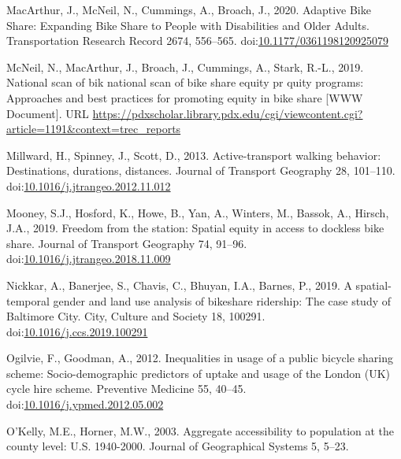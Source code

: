 \documentclass[]{elsarticle} %
\begin{document}
\leavevmode\hypertarget{ref-macarthurAdaptiveBikeShare2020}{}%
MacArthur, J., McNeil, N., Cummings, A., Broach, J., 2020. Adaptive Bike
Share: Expanding Bike Share to People with Disabilities and Older
Adults. Transportation Research Record 2674, 556--565.
doi:\href{https://doi.org/10.1177/0361198120925079}{10.1177/0361198120925079}

\leavevmode\hypertarget{ref-trec2019}{}%
McNeil, N., MacArthur, J., Broach, J., Cummings, A., Stark, R.-L., 2019.
National scan of bik national scan of bike share equity pr quity
programs: Approaches and best practices for promoting equity in bike
share {[}WWW Document{]}. URL
\url{https://pdxscholar.library.pdx.edu/cgi/viewcontent.cgi?article=1191\&context=trec_reports}

\leavevmode\hypertarget{ref-millwardActivetransportWalkingBehavior2013}{}%
Millward, H., Spinney, J., Scott, D., 2013. Active-transport walking
behavior: Destinations, durations, distances. Journal of Transport
Geography 28, 101--110.
doi:\href{https://doi.org/10.1016/j.jtrangeo.2012.11.012}{10.1016/j.jtrangeo.2012.11.012}

\leavevmode\hypertarget{ref-mooneyFreedomStationSpatial2019}{}%
Mooney, S.J., Hosford, K., Howe, B., Yan, A., Winters, M., Bassok, A.,
Hirsch, J.A., 2019. Freedom from the station: Spatial equity in access
to dockless bike share. Journal of Transport Geography 74, 91--96.
doi:\href{https://doi.org/10.1016/j.jtrangeo.2018.11.009}{10.1016/j.jtrangeo.2018.11.009}

\leavevmode\hypertarget{ref-nickkarSpatialtemporalGenderLand2019}{}%
Nickkar, A., Banerjee, S., Chavis, C., Bhuyan, I.A., Barnes, P., 2019. A
spatial-temporal gender and land use analysis of bikeshare ridership:
The case study of Baltimore City. City, Culture and Society 18, 100291.
doi:\href{https://doi.org/10.1016/j.ccs.2019.100291}{10.1016/j.ccs.2019.100291}

\leavevmode\hypertarget{ref-ogilvieInequalitiesUsagePublic2012}{}%
Ogilvie, F., Goodman, A., 2012. Inequalities in usage of a public
bicycle sharing scheme: Socio-demographic predictors of uptake and usage
of the London (UK) cycle hire scheme. Preventive Medicine 55, 40--45.
doi:\href{https://doi.org/10.1016/j.ypmed.2012.05.002}{10.1016/j.ypmed.2012.05.002}

\leavevmode\hypertarget{ref-okelly2003aggregate}{}%
O'Kelly, M.E., Horner, M.W., 2003. Aggregate accessibility to population
at the county level: U.S. 1940-2000. Journal of Geographical Systems 5,
5--23.
\end{document}
